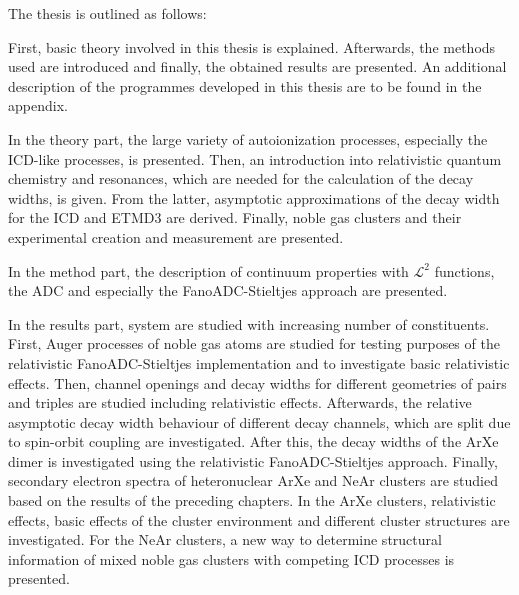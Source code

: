 The thesis is outlined as follows:

First, basic theory involved in this thesis is explained. Afterwards, the
methods used are introduced and finally, the obtained results are presented.
An additional description of the programmes developed in this thesis are to
be found in the appendix.

In the theory part, the large variety of autoionization processes,
especially the \ac{ICD}-like processes, is presented. Then, an introduction
into relativistic quantum chemistry and resonances, which are needed for
the calculation of the decay widths, is given. From the latter, asymptotic
approximations of the decay width for the \ac{ICD} and ETMD3 are derived.
Finally, noble gas clusters and their experimental creation and measurement
are presented.

In the method part, the description of continuum properties with $\mathcal{L}^2$
functions, the \ac{ADC} and especially the FanoADC-Stieltjes approach are
presented.

In the results part, system are studied with increasing number of constituents.
First, Auger processes of noble gas atoms are studied for testing purposes
of the relativistic FanoADC-Stieltjes implementation and to investigate
basic relativistic effects. Then, channel openings and decay widths for
different geometries of pairs and triples are studied including relativistic
effects. Afterwards, the relative asymptotic decay width behaviour
of different decay channels, which are split due to spin-orbit coupling are
investigated. After this, the decay widths of the ArXe dimer is investigated
using the relativistic FanoADC-Stieltjes approach. Finally, secondary electron
spectra of heteronuclear ArXe and NeAr clusters are studied based on the
results of the preceding chapters.
In the ArXe clusters, relativistic effects, basic effects of the cluster environment
and different cluster structures are investigated.
For the NeAr clusters, a new way to determine structural information of mixed
noble gas clusters with competing \ac{ICD} processes is presented.
